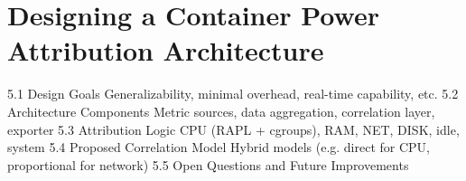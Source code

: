 \chapter{Designing a Container Power Attribution Architecture} %
\label{Chapter5}


    5.1 Design Goals
        Generalizability, minimal overhead, real-time capability, etc.
    5.2 Architecture Components
        Metric sources, data aggregation, correlation layer, exporter
    5.3 Attribution Logic
        CPU (RAPL + cgroups), RAM, NET, DISK, idle, system
    5.4 Proposed Correlation Model
        Hybrid models (e.g. direct for CPU, proportional for network)
    5.5 Open Questions and Future Improvements